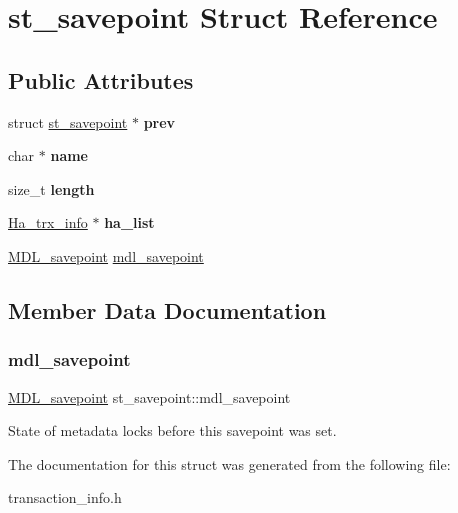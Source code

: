 \hypertarget{structst__savepoint}{}\section{st\+\_\+savepoint Struct Reference}
\label{structst__savepoint}
\subsection*{Public Attributes}
\begin{DoxyCompactItemize}
\item 
\mbox{\label{structst__savepoint_a0918311fc24fb905a0ec983fe2af6b10}} 
struct \mbox{\hyperlink{structst__savepoint}{st\+\_\+savepoint}} $\ast$ {\bfseries prev}
\item 
\mbox{\label{structst__savepoint_ace0185319fb329402071858f3ccdd5f0}} 
char $\ast$ {\bfseries name}
\item 
\mbox{\label{structst__savepoint_a86c66c5bf48612c7f64fffe65571d653}} 
size\+\_\+t {\bfseries length}
\item 
\mbox{\label{structst__savepoint_a085d578ae1f2f761dfc9ed864c794bff}} 
\mbox{\hyperlink{classHa__trx__info}{Ha\+\_\+trx\+\_\+info}} $\ast$ {\bfseries ha\+\_\+list}
\item 
\mbox{\hyperlink{classMDL__savepoint}{M\+D\+L\+\_\+savepoint}} \mbox{\hyperlink{structst__savepoint_a9de1c92dd3e525aa1bd145cdd438a072}{mdl\+\_\+savepoint}}
\end{DoxyCompactItemize}


\subsection{Member Data Documentation}
\mbox{\label{structst__savepoint_a9de1c92dd3e525aa1bd145cdd438a072}} 
\subsubsection{\texorpdfstring{mdl\+\_\+savepoint}{mdl\_savepoint}}
{\footnotesize\ttfamily \mbox{\hyperlink{classMDL__savepoint}{M\+D\+L\+\_\+savepoint}} st\+\_\+savepoint\+::mdl\+\_\+savepoint}

State of metadata locks before this savepoint was set. 

The documentation for this struct was generated from the following file\+:\begin{DoxyCompactItemize}
\item 
transaction\+\_\+info.\+h\end{DoxyCompactItemize}
